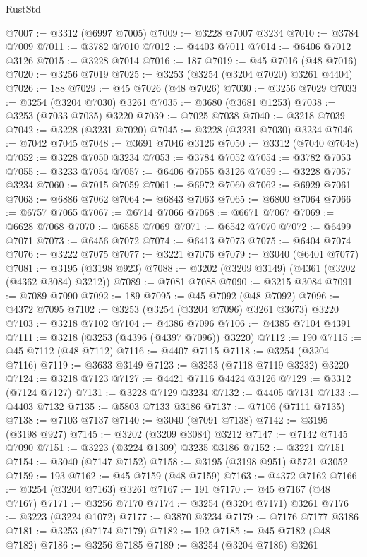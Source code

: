 \begin{lexlean}{RustStd}
\begin{coremodule}
@7007 := @3312 (@6997 @7005)
@7009 := @3228 @7007 @3234
@7010 := @3784 @7009
@7011 := @3782 @7010
@7012 := @4403 @7011
@7014 := @6406 @7012 @3126
@7015 := @3228 @7014
@7016 := 187
@7019 := @45 @7016 (@48 @7016)
@7020 := @3256 @7019
@7025 := @3253 (@3254 (@3204 @7020) @3261 @4404)
@7026 := 188
@7029 := @45 @7026 (@48 @7026)
@7030 := @3256 @7029
@7033 := @3254 (@3204 @7030) @3261
@7035 := @3680 (@3681 @1253)
@7038 := @3253 (@7033 @7035) @3220
@7039 := @7025 @7038
@7040 := @3218 @7039
@7042 := @3228 (@3231 @7020)
@7045 := @3228 (@3231 @7030) @3234
@7046 := @7042 @7045
@7048 := @3691 @7046 @3126
@7050 := @3312 (@7040 @7048)
@7052 := @3228 @7050 @3234
@7053 := @3784 @7052
@7054 := @3782 @7053
@7055 := @3233 @7054
@7057 := @6406 @7055 @3126
@7059 := @3228 @7057 @3234
@7060 := @7015 @7059
@7061 := @6972 @7060
@7062 := @6929 @7061
@7063 := @6886 @7062
@7064 := @6843 @7063
@7065 := @6800 @7064
@7066 := @6757 @7065
@7067 := @6714 @7066
@7068 := @6671 @7067
@7069 := @6628 @7068
@7070 := @6585 @7069
@7071 := @6542 @7070
@7072 := @6499 @7071
@7073 := @6456 @7072
@7074 := @6413 @7073
@7075 := @6404 @7074
@7076 := @3222 @7075
@7077 := @3221 @7076
@7079 := @3040 (@6401 @7077)
@7081 := @3195 (@3198 @923)
@7088 := @3202 (@3209 @3149) (@4361 (@3202 (@4362 @3084) @3212))
@7089 := @7081 @7088
@7090 := @3215 @3084
@7091 := @7089 @7090
@7092 := 189
@7095 := @45 @7092 (@48 @7092)
@7096 := @4372 @7095
@7102 := @3253 (@3254 (@3204 @7096) @3261 @3673) @3220
@7103 := @3218 @7102
@7104 := @4386 @7096
@7106 := @4385 @7104 @4391
@7111 := @3218 (@3253 (@4396 (@4397 @7096)) @3220)
@7112 := 190
@7115 := @45 @7112 (@48 @7112)
@7116 := @4407 @7115
@7118 := @3254 (@3204 @7116)
@7119 := @3633 @3149
@7123 := @3253 (@7118 @7119 @3232) @3220
@7124 := @3218 @7123
@7127 := @4421 @7116 @4424 @3126
@7129 := @3312 (@7124 @7127)
@7131 := @3228 @7129 @3234
@7132 := @4405 @7131
@7133 := @4403 @7132
@7135 := @5803 @7133 @3186
@7137 := @7106 (@7111 @7135)
@7138 := @7103 @7137
@7140 := @3040 (@7091 @7138)
@7142 := @3195 (@3198 @927)
@7145 := @3202 (@3209 @3084) @3212
@7147 := @7142 @7145 @7090
@7151 := @3223 (@3224 @1309) @3235 @3186
@7152 := @3221 @7151
@7154 := @3040 (@7147 @7152)
@7158 := @3195 (@3198 @951) @5721 @3052
@7159 := 193
@7162 := @45 @7159 (@48 @7159)
@7163 := @4372 @7162
@7166 := @3254 (@3204 @7163) @3261
@7167 := 191
@7170 := @45 @7167 (@48 @7167)
@7171 := @3256 @7170
@7174 := @3254 (@3204 @7171) @3261
@7176 := @3223 (@3224 @1072)
@7177 := @3870 @3234
@7179 := @7176 @7177 @3186
@7181 := @3253 (@7174 @7179)
@7182 := 192
@7185 := @45 @7182 (@48 @7182)
@7186 := @3256 @7185
@7189 := @3254 (@3204 @7186) @3261

\end{coremodule}
\end{lexlean}
